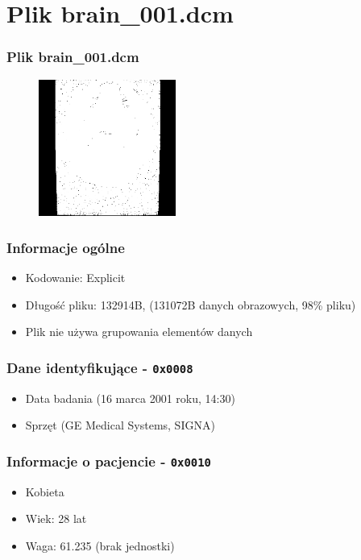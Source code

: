 
\section{Plik brain\_001.dcm}
\begin{frame}
  \frametitle{Plik brain\_001.dcm}

  \begin{figure}
    \includegraphics[width=0.4\textwidth]{brain}
  \end{figure}
\end{frame}

\begin{frame}
  \frametitle{Informacje ogólne}
  \begin{itemize}
    \item Kodowanie: Explicit
    \item Długość pliku: 132914B, (131072B danych obrazowych, 98\% pliku)
    \item Plik nie używa grupowania elementów danych
  \end{itemize}
\end{frame}

\begin{frame}
  \frametitle{Dane identyfikujące - \texttt{0x0008}}

  \begin{itemize}
    \item Data badania (16 marca 2001 roku, 14:30)
    \item Sprzęt (GE Medical Systems, SIGNA)
  \end{itemize}
\end{frame}


\begin{frame}
  \frametitle{Informacje o pacjencie - \texttt{0x0010}}

  \begin{itemize}
    \item Kobieta
    \item Wiek: 28 lat
    \item Waga: 61.235 (brak jednostki)
  \end{itemize}
\end{frame}

